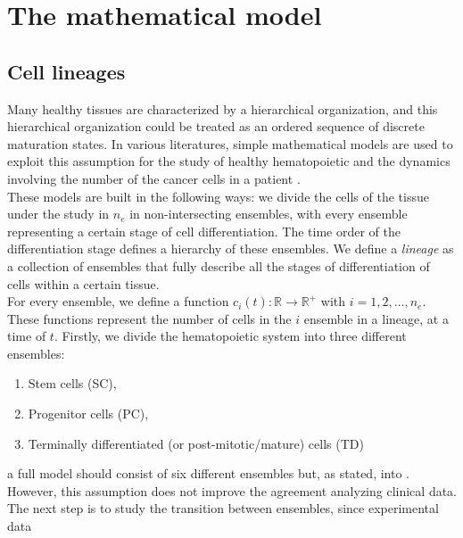 \documentclass[a4paper,10pt]{article}
\begin{document}
\section{The mathematical model}

\subsection{Cell lineages}
Many healthy tissues are characterized 
by a hierarchical organization, and this hierarchical organization could be treated as
an ordered sequence of discrete maturation states.  In various literatures,
simple mathematical models 
are used to exploit this assumption for the study of healthy hematopoietic \cite{czochra} and
the dynamics involving the number of the cancer cells in a patient
\cite{sottoriva, michor2005,altrock2015mathematics, stiehl2018mathematical, stiehl2012mathematical}.\\
These models are built in the following ways:
\cite{sottoriva, michor2005, tang2011dynamics, olshen2014dynamics, altrock2015mathematics, stiehl2018mathematical, stiehl2012mathematical} 
we divide the cells of the tissue under the study in $n_{e}$ 
in non-intersecting ensembles, with every ensemble 
representing a certain stage of cell differentiation.
The time order of the differentiation stage defines a hierarchy of these ensembles.
We define a \textit{lineage} as a collection of ensembles that fully describe all
the stages of differentiation of cells within a certain tissue.\\ 
For every ensemble, we define a function
$c_{i}(t):\mathbb{R}\longrightarrow\mathbb{R}^+$ 
with $i=1,2,\dots,n_{e}$.
These functions
represent the number of cells in the $i$ ensemble
in a lineage, at a time of $t$.
Firstly, we divide the hematopoietic system into three different ensembles:
\begin{enumerate}
\item Stem cells (SC),
\item Progenitor cells (PC),
\item Terminally differentiated (or post-mitotic/mature) cells (TD)
\end{enumerate}
a full model should 
consist of six different ensembles but, as stated, into
\cite{sottoriva, stiehl2012mathematical}. However,
this assumption does not improve  the agreement
analyzing clinical data.\\
The next step is to study the transition between ensembles,
since experimental data \cite{michor2005, tang2011dynamics, olshen2014dynamics, rainero2018gdna} 
\end{document}
